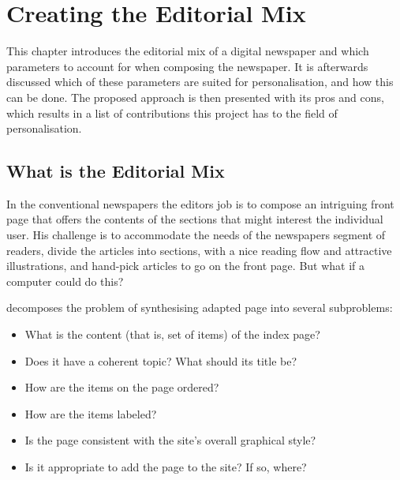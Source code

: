 \chapter{Creating the Editorial Mix} %
\label{ch:introduction}
This chapter introduces the editorial mix of a digital newspaper and which parameters to account for when composing the newspaper. It is afterwards discussed which of these parameters are suited for personalisation, and how this can be done. The proposed approach is then presented with its pros and cons, which results in a list of contributions this project has to the field of personalisation.

\section{What is the Editorial Mix}
In the conventional newspapers the editors job is to compose an intriguing front page that offers the contents of the sections that might interest the individual user. His challenge is to accommodate the needs of the newspapers segment of readers, divide the articles into sections, with a nice reading flow and attractive illustrations, and hand-pick articles to go on the front page. But what if a computer could do this?

\cite{perkowitz-Adaptive-Web-Sites} decomposes the problem of synthesising adapted page into several subproblems:
\begin{itemize}
	\item What is the content (that is, set of items) of the index page?
	\item Does it have a coherent topic? What should its title be?
	\item How are the items on the page ordered?
	\item How are the items labeled?
	\item Is the page consistent with the site's overall graphical style?
	\item Is it appropriate to add the page to the site? If so, where?
\end{itemize}


